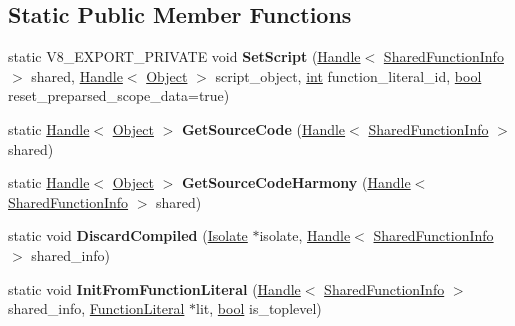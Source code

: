 \subsection*{Static Public Member Functions}
\begin{DoxyCompactItemize}
\item 
\mbox{\label{classv8_1_1internal_1_1SharedFunctionInfo_a7581456722c296cb8f2f86eca3502d33}} 
static V8\+\_\+\+E\+X\+P\+O\+R\+T\+\_\+\+P\+R\+I\+V\+A\+TE void {\bfseries Set\+Script} (\mbox{\hyperlink{classv8_1_1internal_1_1Handle}{Handle}}$<$ \mbox{\hyperlink{classv8_1_1internal_1_1SharedFunctionInfo}{Shared\+Function\+Info}} $>$ shared, \mbox{\hyperlink{classv8_1_1internal_1_1Handle}{Handle}}$<$ \mbox{\hyperlink{classv8_1_1internal_1_1Object}{Object}} $>$ script\+\_\+object, \mbox{\hyperlink{classint}{int}} function\+\_\+literal\+\_\+id, \mbox{\hyperlink{classbool}{bool}} reset\+\_\+preparsed\+\_\+scope\+\_\+data=true)
\item 
\mbox{\label{classv8_1_1internal_1_1SharedFunctionInfo_add45f1d92220d817772ee4575d360f1e}} 
static \mbox{\hyperlink{classv8_1_1internal_1_1Handle}{Handle}}$<$ \mbox{\hyperlink{classv8_1_1internal_1_1Object}{Object}} $>$ {\bfseries Get\+Source\+Code} (\mbox{\hyperlink{classv8_1_1internal_1_1Handle}{Handle}}$<$ \mbox{\hyperlink{classv8_1_1internal_1_1SharedFunctionInfo}{Shared\+Function\+Info}} $>$ shared)
\item 
\mbox{\label{classv8_1_1internal_1_1SharedFunctionInfo_aa05972c33a927bc743786fa4a64eecc8}} 
static \mbox{\hyperlink{classv8_1_1internal_1_1Handle}{Handle}}$<$ \mbox{\hyperlink{classv8_1_1internal_1_1Object}{Object}} $>$ {\bfseries Get\+Source\+Code\+Harmony} (\mbox{\hyperlink{classv8_1_1internal_1_1Handle}{Handle}}$<$ \mbox{\hyperlink{classv8_1_1internal_1_1SharedFunctionInfo}{Shared\+Function\+Info}} $>$ shared)
\item 
\mbox{\label{classv8_1_1internal_1_1SharedFunctionInfo_abffd555644afadd77c46f24461360c5f}} 
static void {\bfseries Discard\+Compiled} (\mbox{\hyperlink{classv8_1_1internal_1_1Isolate}{Isolate}} $\ast$isolate, \mbox{\hyperlink{classv8_1_1internal_1_1Handle}{Handle}}$<$ \mbox{\hyperlink{classv8_1_1internal_1_1SharedFunctionInfo}{Shared\+Function\+Info}} $>$ shared\+\_\+info)
\item 
\mbox{\label{classv8_1_1internal_1_1SharedFunctionInfo_a58195b65d873880bb2e09bb0ded5b5cd}} 
static void {\bfseries Init\+From\+Function\+Literal} (\mbox{\hyperlink{classv8_1_1internal_1_1Handle}{Handle}}$<$ \mbox{\hyperlink{classv8_1_1internal_1_1SharedFunctionInfo}{Shared\+Function\+Info}} $>$ shared\+\_\+info, \mbox{\hyperlink{classv8_1_1internal_1_1FunctionLiteral}{Function\+Literal}} $\ast$lit, \mbox{\hyperlink{classbool}{bool}} is\+\_\+toplevel)
\end{DoxyCompactItemize}

